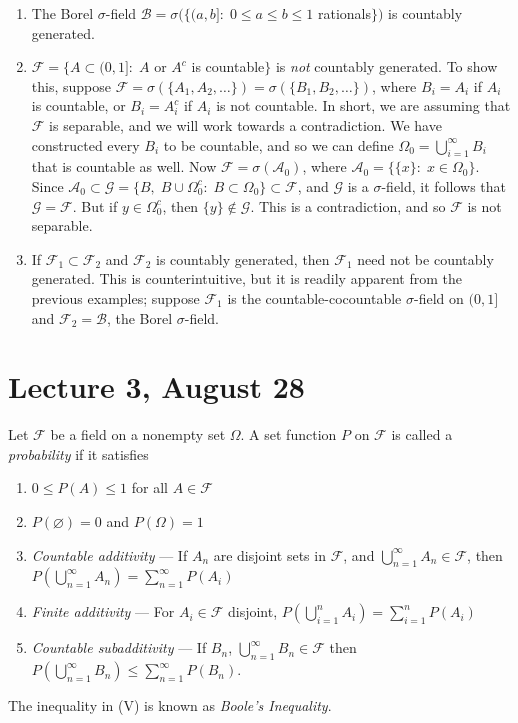 \documentclass[11pt,fleqn]{book} %
\begin{document}
\begin{enumerate}
	\item The Borel $\sigma$-field $\mathcal{B} = \sigma(\{(a,b]:\;0 \leq a \leq b \leq 1$ rationals$\})$ is countably generated.
	\item $\mathcal{F} = \{A \subset (0,1]:\;A$ or $A^c$ is countable$\}$ is \emph{not} countably generated. To show this, suppose $\mathcal{F} = \sigma(\{A_1,A_2,\dots\}) = \sigma(\{B_1,B_2,\dots\})$, where $B_i = A_i$ if $A_i$ is countable, or $B_i = A_i^c$ if $A_i$ is not countable. In short, we are assuming that $\mathcal{F}$ is separable, and we will work towards a contradiction. We have constructed every $B_i$ to be countable, and so we can define $\Omega_0 = \bigcup_{i=1}^\infty B_i$ that is countable as well. Now $\mathcal{F} = \sigma(\mathcal{A}_0)$, where $\mathcal{A}_0 = \{\{x\}:\;x \in \Omega_0\}$. Since $\mathcal{A}_0 \subset \mathcal{G} = \{B,\;B \cup \Omega_0^c:\;B \subset \Omega_0\} \subset \mathcal{F}$, and $\mathcal{G}$ is a $\sigma$-field, it follows that $\mathcal{G} = \mathcal{F}$. But if $y \in \Omega_0^c$, then $\{y\} \notin \mathcal{G}$. This is a contradiction, and so $\mathcal{F}$ is not separable.
	\item If $\mathcal{F}_1 \subset \mathcal{F}_2$ and $\mathcal{F}_2$ is countably generated, then $\mathcal{F}_1$ need not be countably generated. This is counterintuitive, but it is readily apparent from the previous examples; suppose $\mathcal{F}_1$ is the countable-cocountable $\sigma$-field on $(0,1]$ and $\mathcal{F}_2 = \mathcal{B}$, the Borel $\sigma$-field. 
\end{enumerate}

\section{Lecture 3, August 28}

\begin{definition}[Probability]  \label{def:probability}
	Let $\mathcal{F}$ be a field on a nonempty set $\Omega$. A set function $P$ on $\mathcal{F}$ is called a \emph{probability} if it satisfies
	\begin{enumerate}[label=(\Roman*)]
		\item $0 \leq P(A) \leq 1$ for all $A \in \mathcal{F}$
		\item $P(\varnothing) = 0$ and $P(\Omega) = 1$
		\item \emph{Countable additivity} --- If $A_n$ are disjoint sets in $\mathcal{F}$, and $\bigcup_{n=1}^\infty A_n \in \mathcal{F}$, then $P \left( \bigcup_{n=1}^\infty A_n \right) = \sum_{n=1}^\infty P(A_i)$
		\item \emph{Finite additivity} --- For $A_i \in \mathcal{F}$ disjoint, $P \left( \bigcup_{i=1}^n A_i \right) = \sum_{i=1}^n P(A_i)$
		\item \emph{Countable subadditivity} --- If $B_n$, $\bigcup_{n=1}^\infty B_n \in \mathcal{F}$ then $P \left( \bigcup_{n=1}^\infty B_n \right) \leq \sum_{n=1}^\infty P(B_n)$.
	\end{enumerate}
	The inequality in (V) is known as \emph{Boole's Inequality}.
\end{definition}
\end{document}
